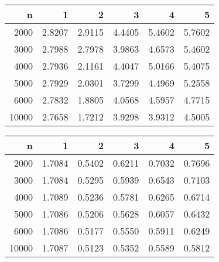 \begin{table}[ht]
\centering
\begin{tabular}{rrrrrr}
  \hline
n & 1 & 2 & 3 & 4 & 5 \\ 
  \hline
2000 & 2.8207 & 2.9115 & 4.4405 & 5.4602 & 5.7602 \\ 
  3000 & 2.7988 & 2.7978 & 3.9863 & 4.6573 & 5.4602 \\ 
  4000 & 2.7936 & 2.1161 & 4.4047 & 5.0166 & 5.4075 \\ 
  5000 & 2.7929 & 2.0301 & 3.7299 & 4.4969 & 5.2558 \\ 
  6000 & 2.7832 & 1.8805 & 4.0568 & 4.5957 & 4.7715 \\ 
  10000 & 2.7658 & 1.7212 & 3.9298 & 3.9312 & 4.5005 \\ 
   \hline
\end{tabular}
\end{table}
\begin{table}[ht]
\centering
\begin{tabular}{rrrrrr}
  \hline
n & 1 & 2 & 3 & 4 & 5 \\ 
  \hline
2000 & 1.7084 & 0.5402 & 0.6211 & 0.7032 & 0.7696 \\ 
  3000 & 1.7084 & 0.5295 & 0.5939 & 0.6543 & 0.7103 \\ 
  4000 & 1.7089 & 0.5236 & 0.5781 & 0.6265 & 0.6714 \\ 
  5000 & 1.7086 & 0.5206 & 0.5628 & 0.6057 & 0.6432 \\ 
  6000 & 1.7086 & 0.5177 & 0.5550 & 0.5911 & 0.6249 \\ 
  10000 & 1.7087 & 0.5123 & 0.5352 & 0.5589 & 0.5812 \\ 
   \hline
\end{tabular}
\end{table}
